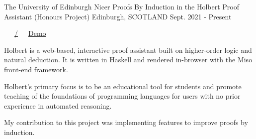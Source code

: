 


\begin{cventries}
  \cventry
    {The University of Edinburgh} %
    {Nicer Proofs By Induction in the Holbert Proof Assistant (Honours Project)} %
    {Edinburgh, SCOTLAND} %
    {Sept. 2021 - Present} %
    {
      \color{awesome} \color{graytext}\ \ \ \href{https://github.com/chrisjpm/holbert}{\faGithub\acvHeaderIconSep\@chrisjpm/\@holbert}\ \ \ \href{http://liamoc.net/holbert}{\faGlobe\acvHeaderIconSep\@Holbert Demo}%
      \vspace{1.8em}
      \begin{cvitems} %
        \item Holbert is a web-based, interactive proof assistant built on higher-order logic and natural deduction. It is written in Haskell and rendered in-browser with the Miso front-end framework.
        \item Holbert’s primary focus is to be an educational tool for students and promote teaching of the foundations of programming languages for users with no prior experience in automated reasoning.
        \item My contribution to this project was implementing features to improve proofs by induction.
      \end{cvitems}
    }
    \vspace{.08cm}
    

\end{cventries}
